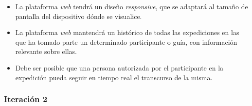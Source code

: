 \begin{itemize}
\item La plataforma \textit{web} tendrá un diseño \textit{responsive}, que se adaptará al tamaño de pantalla del dispositivo dónde se visualice.
\item La plataforma \textit{web} mantendrá un histórico de todas las expediciones en las que ha tomado parte un determinado participante o guía, con información relevante sobre ellas.
\item Debe ser posible que una persona autorizada por el participante en la expedición pueda seguir en tiempo real el transcurso de la misma.
\end{itemize}

\subsubsection{Iteración 2}

